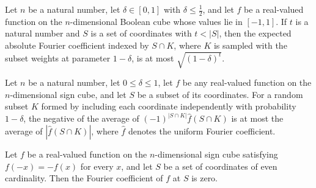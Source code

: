 \begin{theorem}
\label{FABL.oxrRandomSubsetAbsFourierAverage_le_sqrt_of_lt_card}
\leanok
{}
Let $n$ be a natural number, let $\delta\in[0,1]$ with $\delta\le\tfrac12$, and let $f$
be a real-valued function on the $n$-dimensional Boolean cube whose values lie in
$[-1,1]$. If $t$ is a natural number and $S$ is a set of coordinates with $t<|S|$, then
the expected absolute Fourier coefficient indexed by $S\cap K$, where $K$ is sampled
with the subset weights at parameter $1-\delta$, is at most $\sqrt{(1-\delta)^t}$.
\end{theorem}

\begin{theorem}
\label{FABL.neg_oxrRandomSubsetFourierAverage_le_abs}
\leanok
{}
Let $n$ be a natural number, let $0\le\delta\le1$, let $f$ be any real-valued function
on the $n$-dimensional sign cube, and let $S$ be a subset of its coordinates. For a
random subset $K$ formed by including each coordinate independently with probability
$1-\delta$, the negative of the average of $(-1)^{|S\cap K|}\widehat f(S\cap K)$ is at
most the average of $|\widehat f(S\cap K)|$, where $\widehat f$ denotes the uniform
Fourier coefficient.
\end{theorem}

\begin{theorem}
\label{FABL.fourierCoeff_even_eq_zero_of_odd}
\leanok
{}
Let $f$ be a real-valued function on the $n$-dimensional sign cube satisfying
$f(-x)=-f(x)$ for every $x$, and let $S$ be a set of coordinates of even cardinality.
Then the Fourier coefficient of $f$ at $S$ is zero.
\end{theorem}

